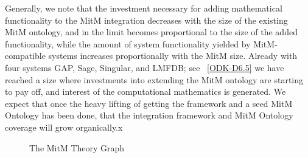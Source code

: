 \documentclass[book]{deliverablereport}
\begin{document}
Generally, we note that the investment necessary for adding mathematical functionality to
the MitM integration decreases with the size of the existing MitM ontology, and in the
limit becomes proportional to the size of the added functionality, while the amount of
system functionality yielded by MitM-compatible systems increases proportionally with the
MitM size. Already with four systems GAP, Sage, Singular, and LMFDB; see ~\ref{ODK-D6.5}
we have reached a size where investments into extending the MitM ontology are starting to
pay off, and interest of the computational mathematics is generated. We expect that once
the heavy lifting of getting the framework and a seed MitM Ontology has been done, that
the integration framework and MitM Ontology coverage will grow organically.x

\begin{figure}\centering
  \caption{The MitM Theory Graph}\label{fig:MitM-graph}
\end{figure}
\printbibliography 
\end{document}
